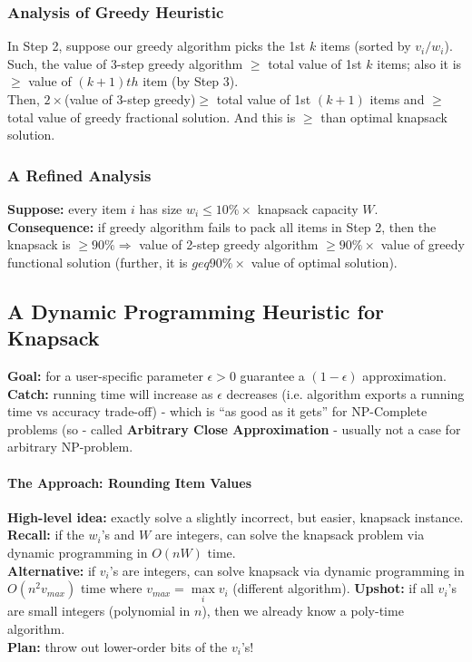 \documentclass{scrartcl}
\begin{document}
\subsubsection{Analysis of Greedy Heuristic}
\label{sec:18-3}
In Step 2, suppose our greedy algorithm picks the 1st $k$ items (sorted by
$v_i/w_i$). Such, the value of 3-step greedy algorithm $\geq$ total value of 1st
$k$ items; also it is $\geq$ value of $(k+1)th$ item (by Step 3).\\
Then, $2 \times $(value of 3-step greedy)$\geq$ total value of 1st $(k+1)$
items and $\geq$ total value of greedy fractional solution.
And this is $\geq$ than optimal knapsack solution.\\

\subsubsection{A Refined Analysis}
\label{sec:18-3-1}
{\bf Suppose: } every item $i$ has size $w_i \leq 10\% \times $ knapsack
capacity $W$.\\
{\bf Consequence:} if greedy algorithm fails to pack all items in Step 2, then
the knapsack is $\geq 90\% \Rightarrow$ value of 2-step greedy algorithm $\geq
90\% \times$ value of greedy functional solution (further, it is $geq 90\%
\times$ value of optimal solution).

\subsection{A Dynamic Programming Heuristic for Knapsack}
\label{sec:18-4}
{\bf Goal: } for a user-specific parameter $\epsilon > 0$ guarantee a $(1 -
\epsilon)$ approximation.\\
{\bf Catch: } running time will increase as $\epsilon$ decreases (i.e. algorithm
exports a running time vs accuracy trade-off)
- which is ``as good as it gets'' for NP-Complete problems (so - called {\bf Arbitrary Close Approximation} - usually not a case for arbitrary NP-problem. 

\paragraph{The Approach: Rounding Item Values}
{\bf High-level idea: } exactly solve a slightly incorrect, but easier, knapsack
instance. \\
{\bf Recall: } if the $w_i$'s and $W$ are integers, can solve the knapsack
problem via dynamic programming in $O(nW)$ time. \\
{\bf Alternative: } if $v_i$'s are integers, can solve knapsack via dynamic
programming in $O(n^2 v_{max})$ time where $v_{max} = \max \limits_iv_i$
(different algorithm).
{\bf Upshot: } if all $v_i$'s are small integers (polynomial in $n$), then we
already know a poly-time algorithm.\\
{\bf Plan: } throw out lower-order bits of the $v_i$'s!
\end{document}
